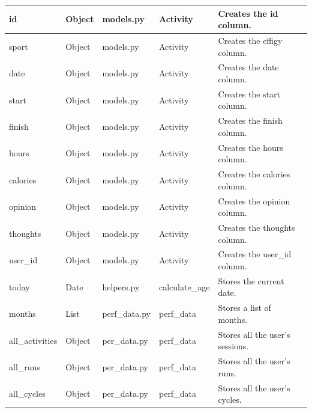 \documentclass{article}[12pt,a4paper]
\begin{document}
\begin{table}[h]
\begin{tabular}{lllll}
id                & Object        & models.py           & Activity                & Creates the id column.                  \\ \hline
sport             & Object        & models.py           & Activity                & Creates the effigy column.              \\ \hline
date              & Object        & models.py           & Activity                & Creates the date column.                \\ \hline
start             & Object        & models.py           & Activity                & Creates the start column.               \\ \hline
finish            & Object        & models.py           & Activity                & Creates the finish column.              \\ \hline
hours             & Object        & models.py           & Activity                & Creates the hours column.               \\ \hline
calories          & Object        & models.py           & Activity                & Creates the calories column.            \\ \hline
opinion           & Object        & models.py           & Activity                & Creates the opinion column.             \\ \hline
thoughts          & Object        & models.py           & Activity                & Creates the thoughts column.            \\ \hline
user\_id          & Object        & models.py           & Activity                & Creates the user\_id column.            \\ \hline
today             & Date          & helpers.py          & calculate\_age          & Stores the current date.                \\ \hline
months            & List          & perf\_data.py       & perf\_data              & Stores a list of months.                \\ \hline
all\_activities   & Object        & per\_data.py        & perf\_data              & Stores all the user's sessions.         \\ \hline
all\_runs         & Object        & per\_data.py        & perf\_data              & Stores all the user's runs.             \\ \hline
all\_cycles       & Object        & per\_data.py        & perf\_data              & Stores all the user's cycles.           \\ \hline

\end{tabular}
\end{table}
\end{document}
